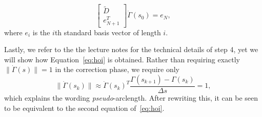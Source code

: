 \begin{equation}
  \begin{bmatrix}
    \tilde{D} \\ e_{N+1}^T
  \end{bmatrix}
  \dot\Gamma(s_0)
  =
  e_{N},
\end{equation}
where $e_{i}$ is the $i$th standard basis vector of length $i.$ 

Lastly, we refer to the the lecture notes for the technical details of step 4, yet we will show how Equation~\eqref{eq:hoi} is obtained. Rather than requiring exactly $\|\dot\Gamma(s)\| = 1$ in the correction phase, we require only
\begin{equation}
  \|\dot\Gamma(s_k)\| \approx \dot\Gamma(s_k)^T \frac{\Gamma(s_{k+1}) - \Gamma(s_k)}{\Delta s} = 1,
\end{equation}
which explains the wording {\em pseudo}-arclength. After rewriting this, it can be seen to be equivalent to the second equation of~\eqref{eq:hoi}.